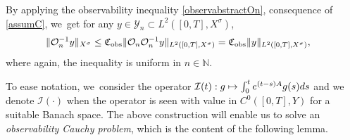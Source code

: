 \documentclass[JEP,XML,SOM,Unicode,published]{cedram}
\newcommand\mto{\mathchoice{\longmapsto}{\mapsto}{\mapsto}{\mapsto}}
\theoremstyle{definition}
\let\mc\mathcal
\renewcommand{\O}{\mc{O}}
\newcommand{\Y}{\mc{Y}}
\newcommand{\N}{\mathbb{N}}
\providecommand{\norm}[1]{\lVert#1\rVert}
\begin{document}
By applying the observability inequality \eqref{observabstractOn}, consequence of \cref{assumC}, we~get for any $y\in \Y_n \subset L^2([0, T], X^\sigma)$,
\begin{align}
\label{boundOn-1}
\norm{\O_n^{-1}y}_{X^\sigma}&\leq \mathfrak{C}_{\textup{obs}}\norm{\O_{n}\O_n^{-1}y}_{L^2([0, T], X^\sigma)}=\mathfrak{C}_{\textup{obs}}\norm{y}_{L^2([0, T], X^\sigma)},
\end{align}
where again, the inequality is uniform in $n\in \N$.

To ease notation, we~consider the operator $\mc{I}(t): g\mto \int_0^t e^{(t-s)A}g(s)ds$ and we denote $\mc{I}(\cdot)$ when the operator is seen with value in $C^{0}([0,T],Y)$ for a suitable Banach space. The above construction will enable us to solve an \emph{observability Cauchy problem}, which is the content of the following lemma.
\end{document}
